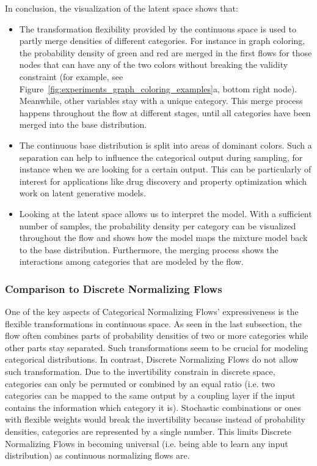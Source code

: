 In conclusion, the visualization of the latent space shows that:
\begin{itemize}
    \item The transformation flexibility provided by the continuous space is used to partly merge densities of different categories. For instance in graph coloring, the probability density of green and red are merged in the first flows for those nodes that can have any of the two colors without breaking the validity constraint (for example, see Figure~\ref{fig:experiments_graph_coloring_examples}a, bottom right node). 
    Meanwhile, other variables stay with a unique category.
    This merge process happens throughout the flow at different stages, until all categories have been merged into the base distribution.
    \item The continuous base distribution is split into areas of dominant colors. Such a separation can help to influence the categorical output during sampling, for instance when we are looking for a certain output. 
    This can be particularly of interest for applications like drug discovery and property optimization which work on latent generative models.
    \item Looking at the latent space allows us to interpret the model. With a sufficient number of samples, the probability density per category can be visualized throughout the flow and shows how the model maps the mixture model back to the base distribution. Furthermore, the merging process shows the interactions among categories that are modeled by the flow.
\end{itemize}

\subsubsection{Comparison to Discrete Normalizing Flows}

One of the key aspects of Categorical Normalizing Flows' expressiveness is the flexible transformations in continuous space. 
As seen in the last subsection, the flow often combines parts of probability densities of two or more categories while other parts stay separated.
Such transformations seem to be crucial for modeling categorical distributions.
In contrast, Discrete Normalizing Flows do not allow such transformation.
Due to the invertibility constrain in discrete space, categories can only be permuted or combined by an equal ratio (i.e. two categories can be mapped to the same output by a coupling layer if the input contains the information which category it is). 
Stochastic combinations or ones with flexible weights would break the invertibility because instead of probability densities, categories are represented by a single number. 
This limits Discrete Normalizing Flows in becoming universal (i.e. being able to learn any input distribution) as continuous normalizing flows are.

